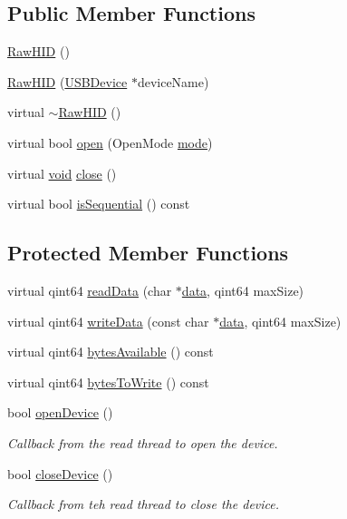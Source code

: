 \subsection*{Public Member Functions}
\begin{DoxyCompactItemize}
\item 
\hyperlink{group___raw_h_i_d_plugin_gab8670136473a97cded80dd1a4e785680}{Raw\-H\-I\-D} ()
\item 
\hyperlink{group___raw_h_i_d_plugin_gae7f570657448daa4890a0e38f693e6ed}{Raw\-H\-I\-D} (\hyperlink{class_u_s_b_device}{U\-S\-B\-Device} $\ast$device\-Name)
\item 
virtual \hyperlink{group___raw_h_i_d_plugin_gaa925a3d3cbb80dd61705cedd4a0d5167}{$\sim$\-Raw\-H\-I\-D} ()
\item 
virtual bool \hyperlink{group___raw_h_i_d_plugin_ga58a13b23858ae0b323802154fa2b93a8}{open} (Open\-Mode \hyperlink{glext_8h_a1e71d9c196e4683cc06c4b54d53f7ef5}{mode})
\item 
virtual \hyperlink{group___u_a_v_objects_plugin_ga444cf2ff3f0ecbe028adce838d373f5c}{void} \hyperlink{group___raw_h_i_d_plugin_gad109f6050214525dde9804f5a20bf53f}{close} ()
\item 
virtual bool \hyperlink{group___raw_h_i_d_plugin_gaf9b8ab547528829a7ef19c1d9a9e692a}{is\-Sequential} () const 
\end{DoxyCompactItemize}
\subsection*{Protected Member Functions}
\begin{DoxyCompactItemize}
\item 
virtual qint64 \hyperlink{group___raw_h_i_d_plugin_gac4b532c2c57925141897d91434924e80}{read\-Data} (char $\ast$\hyperlink{glext_8h_a8850df0785e6fbcc2351af3b686b8c7a}{data}, qint64 max\-Size)
\item 
virtual qint64 \hyperlink{group___raw_h_i_d_plugin_ga59184fec2a68eecf3e08e81303b8cdbe}{write\-Data} (const char $\ast$\hyperlink{glext_8h_a8850df0785e6fbcc2351af3b686b8c7a}{data}, qint64 max\-Size)
\item 
virtual qint64 \hyperlink{group___raw_h_i_d_plugin_ga5bd4826624aa1689aedbfd1832c4ddb4}{bytes\-Available} () const 
\item 
virtual qint64 \hyperlink{group___raw_h_i_d_plugin_gaf0246fd49e7dc9cda82b983312f4a782}{bytes\-To\-Write} () const 
\item 
bool \hyperlink{group___raw_h_i_d_plugin_gafc323c516287e2e1e5e12b425cd28b4b}{open\-Device} ()
\begin{DoxyCompactList}\small\item\em Callback from the read thread to open the device. \end{DoxyCompactList}\item 
bool \hyperlink{group___raw_h_i_d_plugin_ga6cf706b44d1aaf58b4218b3cacbc6218}{close\-Device} ()
\begin{DoxyCompactList}\small\item\em Callback from teh read thread to close the device. \end{DoxyCompactList}\end{DoxyCompactItemize}
